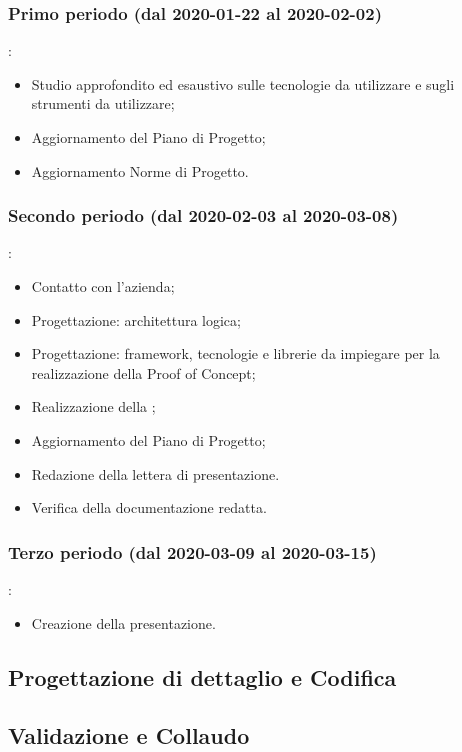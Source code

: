		\subsubsection{Primo periodo (dal 2020-01-22 al 2020-02-02)}:
			\begin{itemize}
			 	\item Studio approfondito ed esaustivo sulle tecnologie da utilizzare e sugli strumenti da utilizzare;
			 	\item Aggiornamento del Piano di Progetto;
			 	\item Aggiornamento Norme di Progetto.
			\end{itemize} 	
		
		\subsubsection{Secondo periodo (dal 2020-02-03 al 2020-03-08)}:
			\begin{itemize}
				\item Contatto con l'azienda;
				\item Progettazione: architettura logica;
				\item Progettazione: framework, tecnologie e librerie da impiegare per la realizzazione della Proof of Concept;
				\item Realizzazione della ;
				\item Aggiornamento del Piano di Progetto;
				\item Redazione della lettera di presentazione.
				\item Verifica della documentazione redatta.
			\end{itemize}

		\subsubsection{Terzo periodo (dal 2020-03-09 al 2020-03-15)}:
			\begin{itemize}
				\item Creazione della presentazione.
			\end{itemize}

	\subsection{Progettazione di dettaglio e Codifica}
	
	\subsection{Validazione e Collaudo}		


